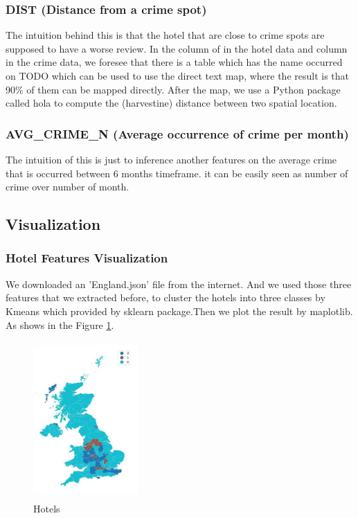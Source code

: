 \documentclass[conference]{IEEEtran}
\begin{document}
\subsubsection{DIST (Distance from a crime spot)}
The intuition behind this is that the hotel that are close to crime spots are supposed to have a worse review. In the column of in the hotel data and column in the crime data, we foresee that there is a table which has the name occurred on TODO which can be used to use the direct text map, where the result is that 90\% of them can be mapped directly. After the map, we use a Python package called hola to compute the (harvestine) distance between two spatial location.

\subsubsection{AVG\_CRIME\_N (Average occurrence of crime per month)}
The intuition of this is just to inference another features on the average crime that is occurred between 6 months timeframe. it can be easily seen as number of crime over number of month.

\subsection{Visualization}
\subsubsection{Hotel Features Visualization}
We downloaded an 'England.json' file from the internet. And we used those three features that we extracted before, to cluster the hotels into three classes by Kmeans which provided by sklearn package.Then we plot the result by maplotlib. As shows in the Figure \ref{fig:hotelsmap}.

\begin{figure}[h]
  \centering
  \includegraphics[width=4cm,height=6cm]{Hotels.jpg}
  \caption{Hotels}
  \label{fig:hotelsmap}
\end{figure}
\end{document}
